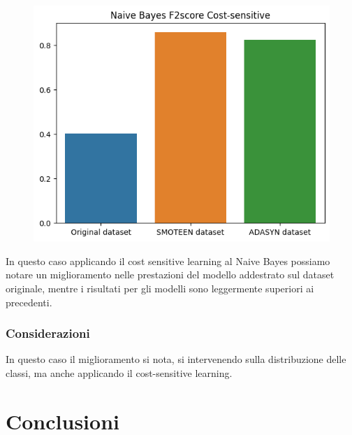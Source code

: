 \documentclass[italian,12pt,a4paper]{article}
\begin{document}
\begin{center}
\begin{table}[h]
\begin{tabular}{|p{2cm}|r|}
			\end{tabular}
		\end{table}
		\begin{figure}[h]
			\centering
			\includegraphics[scale=0.73]{BayesCostSens}
		\end{figure}
	\end{center}
	
	In questo caso applicando il cost sensitive learning al Naive Bayes possiamo notare un miglioramento nelle prestazioni del modello addestrato sul dataset originale, mentre i risultati per gli modelli sono leggermente superiori ai precedenti.
	
	\subsubsection{Considerazioni}
	In questo caso il miglioramento si nota, si intervenendo sulla distribuzione delle classi, ma anche applicando il cost-sensitive learning.
	
	
	\section{Conclusioni}
	

	
\end{document}
